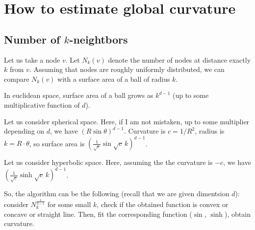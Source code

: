 \documentclass{article}
\begin{document}



\section{How to estimate global curvature}

\subsection{Number of $k$-neightbors}

Let us take a node $v$. Let $N_k(v)$ denote the number of nodes at distance exactly $k$ from $v$. Assuming that nodes are roughly uniformly distributed, we can compare $N_k(v)$ with a surface area of a ball of radius $k$. 

In euclidean space, surface area of a ball grows as $k^{d-1}$ (up to some multiplicative function of $d$). 

Let us consider spherical space. Here, if I am not mistaken, up to some multiplier depending on $d$, we have  $\left(R \sin \theta\right)^{d-1}$. Curvature is $c = 1/R^2$, radius is $k = R \cdot \theta$, so surface area is $\left(\frac{1}{\sqrt{c}}\sin{\sqrt{c}\,k}\right)^{d-1}$.

Let us consider hyperbolic space. Here, assuming the the curvature is $-c$, we have $\left(\frac{1}{\sqrt{c}}\sinh{\sqrt{c}\,k}\right)^{d-1}$.

So, the algorithm can be the following (recall that we are given dimentsion $d$): consider $N_k^{\frac 1 {d-1}}$ for some small $k$, check if the obtained function is convex or concave or straight line. Then, fit the corresponding function ($\sin$, $\sinh$), obtain curvature.
\end{document}
